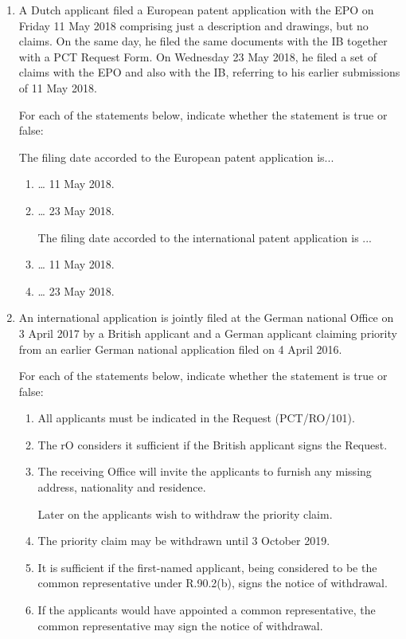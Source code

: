 \documentclass{report}
\begin{document}
\begin{enumerate}[label=\textbf{Question \arabic*}]
    \item %
A Dutch applicant filed a European patent application with the EPO on Friday 11 May 2018 comprising just a description and drawings, but no claims. On the same day, he filed the same documents with the IB together with a PCT Request Form. On Wednesday 23 May 2018, he filed a set of claims with the EPO and also with the IB, referring to his earlier submissions of 11 May 2018.


For each of the statements below, indicate whether the statement is true or false:

The filing date accorded to the European patent application is...


    \begin{enumerate}[label=(\alph*)]
        \item  … 11 May 2018.
\item … 23 May 2018.
    
\vspace{0.5cm}

The filing date accorded to the international patent application is ...
 
        \item  … 11 May 2018.
\item … 23 May 2018.
    \end{enumerate}

    \item %
An international application is jointly filed at the German national Office on 3 April 2017 by a British applicant and a German applicant claiming priority from an earlier German national application filed on 4 April 2016.


For each of the statements below, indicate whether the statement is true or false:

    \begin{enumerate}[label=(\alph*)]
        \item  All applicants must be indicated in the Request (PCT/RO/101).
\item The rO considers it sufficient if the British applicant signs the Request.
\item The receiving Office will invite the applicants to furnish any missing address, nationality and residence.
    
\vspace{0.5cm}

Later on the applicants wish to withdraw the priority claim.
 
        \item The priority claim may be withdrawn until 3 October 2019.
\item It is sufficient if the first-named applicant, being considered to be the common representative under R.90.2(b), signs the notice of withdrawal.
\item  If the applicants would have appointed a common representative, the common representative may sign the notice of withdrawal.



\end{enumerate}
\end{enumerate}
\end{document}
